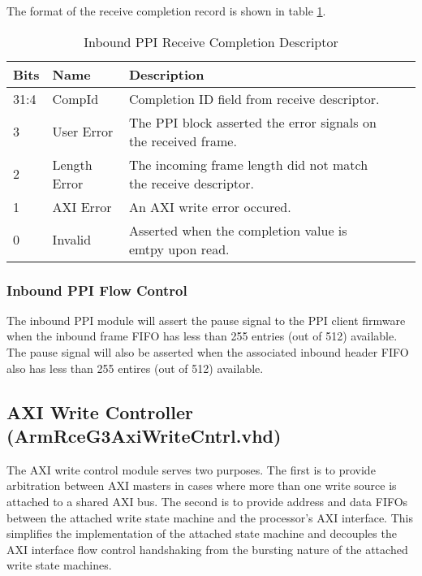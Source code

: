 \documentclass[11pt]{article}
\begin{document}
The format of the receive completion record is shown in table \ref{tab:ib_ppi_comp}.

\begin{table}[H]
\small
\centering
   \begin{tabular}{| l | l | l | l | l | } 
      \hline \textbf{Bits} & \textbf{Name} & \textbf{Description} \\
      \hline 31:4          & CompId        & Completion ID field from receive descriptor.                           \\
      \hline 3             & User Error    & The PPI block asserted the error signals on the received frame.        \\
      \hline 2             & Length Error  & The incoming frame length did not match the receive descriptor.        \\
      \hline 1             & AXI Error     & An AXI write error occured.        \\
      \hline 0             & Invalid       & Asserted when the completion value is emtpy upon read. \\
      \hline
   \end{tabular}
   \caption{Inbound PPI Receive Completion Descriptor}
   \label{tab:ib_ppi_comp}
\end{table}

\subsubsection{Inbound PPI Flow Control}

The inbound PPI module will assert the pause signal to the PPI client firmware when the inbound frame FIFO has less than 255 entries (out of 512)
available. The pause signal will also be asserted when the associated inbound header FIFO also has less than 255 entires (out of 512) available.

\subsection{AXI Write Controller (ArmRceG3AxiWriteCntrl.vhd)}
\label{subsec:ArmRceG3AxiWriteCntrl}

The AXI write control module serves two purposes. The first is to provide arbitration between AXI masters in cases
where more than one write source is attached to a shared AXI bus. The second is to provide address and data FIFOs 
between the attached write state machine and the processor's AXI interface. This simplifies the implementation of the 
attached state machine and decouples the AXI interface flow control handshaking from the bursting nature of the 
attached write state machines.
\end{document}
